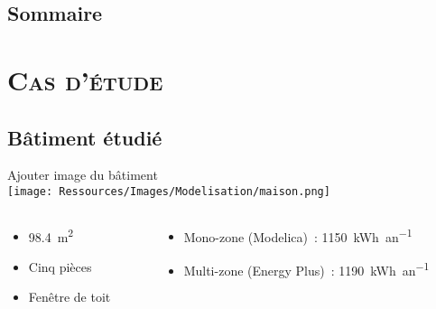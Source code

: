 \documentclass[xcolor=x11names, compress, 11pt]{beamer}
\begin{document}
\subsection{Sommaire}
\begin{frame}[t]
\tableofcontents[hideallsubsections]
\addtocounter{page}{-1}
\end{frame}


















\section{\scshape Cas d’étude}




\subsection{Bâtiment étudié}
\begin{frame}[c]
    \vfill
    \centering
    \alert{Ajouter image du bâtiment} \\
    \texttt{[image: Ressources/Images/Modelisation/maison.png]}
    \begin{columns}
        \begin{column}{0.4\textwidth}
            \centering
            \begin{itemize}
                \item \SI{98.4}{\metre\squared}
                \item Cinq pièces
                \item Fenêtre de toit
            \end{itemize}
        \end{column}%
        \begin{column}{0.7\textwidth}
            \centering
            \begin{itemize}
                \item Mono-zone (Modelica)~: \SI{1150}{kWh\per an}
                \item Multi-zone (Energy Plus)~: \SI{1190}{kWh\per an}
            \end{itemize}
        \end{column}%
    \end{columns}%
    \vfill
\end{frame}
\end{document}
